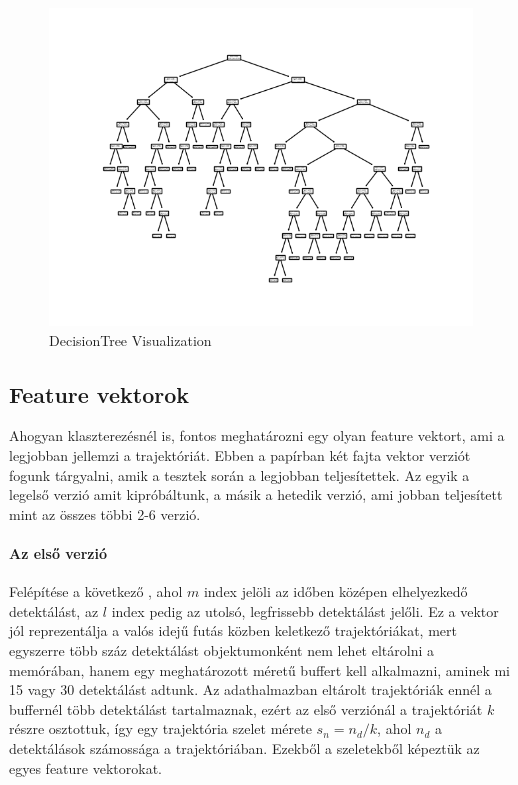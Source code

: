 \documentclass[acmtog, authorversion]{acmart}
\begin{document}
\begin{figure}
    \includegraphics[width=1\columnwidth]{visualization/bellevue_eastgate_DT_2.png}
    \caption{DecisionTree Visualization}
    \label{DTVis}
\end{figure}

\subsection{Feature vektorok}
Ahogyan klaszterezésnél is, fontos meghatározni egy olyan feature vektort, ami a legjobban jellemzi a trajektóriát. Ebben a papírban
két fajta vektor verziót fogunk tárgyalni, amik a tesztek során a legjobban teljesítettek. Az egyik a legelső verzió amit kipróbáltunk,
a másik a hetedik verzió, ami jobban teljesített mint az összes többi 2-6 verzió. 
\paragraph{Az első verzió} Felépítése a következő \begin{math}[x_0, y_0, v_{x_0}, v_{y_0}, x_m, y_m, x_l, y_l, v_{x_l}, v_{y_l}]\end{math}, ahol \begin{math}m\end{math}
index jelöli az időben középen elhelyezkedő detektálást, az \begin{math}l\end{math} index pedig az utolsó, legfrissebb detektálást jelőli.
Ez a vektor jól reprezentálja a valós idejű futás közben keletkező trajektóriákat, mert egyszerre több száz detektálást objektumonként
nem lehet eltárolni a memórában, hanem egy meghatározott méretű buffert kell alkalmazni, aminek mi 15 vagy 30 detektálást adtunk.
Az adathalmazban eltárolt trajektóriák ennél a buffernél több detektálást tartalmaznak, ezért az első verziónál a trajektóriát \begin{math}k\end{math} 
részre osztottuk, így egy trajektória szelet mérete \begin{math}s_n = n_d/k\end{math}, ahol \begin{math}n_d\end{math} a detektálások számossága
a trajektóriában. Ezekből a szeletekből képeztük az egyes feature vektorokat.
\end{document}
